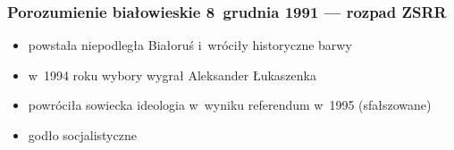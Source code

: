 \subsubsection*{Porozumienie białowieskie 8~grudnia 1991 --- rozpad ZSRR}
\begin{itemize}
    \item powstała niepodległa Białoruś i~wróciły historyczne barwy
    \item w~1994 roku wybory wygrał Aleksander Łukaszenka
    \item powróciła sowiecka ideologia w~wyniku referendum w~1995 (sfałszowane)
    \item godło socjalistyczne
\end{itemize}
